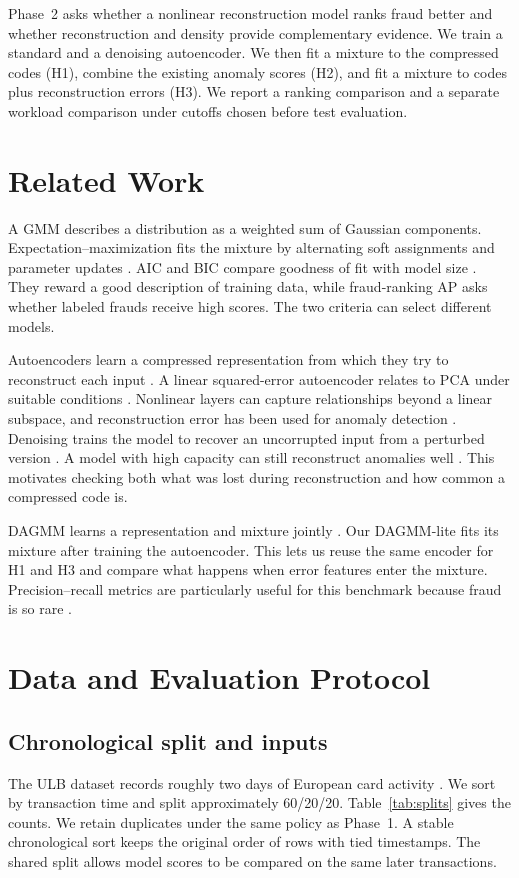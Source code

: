 Phase~2 asks whether a nonlinear reconstruction model ranks fraud better and whether reconstruction and density provide complementary evidence. We train a standard and a denoising autoencoder. We then fit a mixture to the compressed codes (H1), combine the existing anomaly scores (H2), and fit a mixture to codes plus reconstruction errors (H3). We report a ranking comparison and a separate workload comparison under cutoffs chosen before test evaluation.

\section{Related Work}
A GMM describes a distribution as a weighted sum of Gaussian components. Expectation--maximization fits the mixture by alternating soft assignments and parameter updates \cite{dempster1977maximum,mclachlan2000finite}. AIC and BIC compare goodness of fit with model size \cite{akaike1974new,schwarz1978estimating}. They reward a good description of training data, while fraud-ranking AP asks whether labeled frauds receive high scores. The two criteria can select different models.

Autoencoders learn a compressed representation from which they try to reconstruct each input \cite{hinton2006reducing}. A linear squared-error autoencoder relates to PCA under suitable conditions \cite{baldi1989neural}. Nonlinear layers can capture relationships beyond a linear subspace, and reconstruction error has been used for anomaly detection \cite{sakurada2014anomaly}. Denoising trains the model to recover an uncorrupted input from a perturbed version \cite{vincent2008extracting,vincent2011connection}. A model with high capacity can still reconstruct anomalies well \cite{gong2019memorizing}. This motivates checking both what was lost during reconstruction and how common a compressed code is.

DAGMM learns a representation and mixture jointly \cite{zong2018deep}. Our DAGMM-lite fits its mixture after training the autoencoder. This lets us reuse the same encoder for H1 and H3 and compare what happens when error features enter the mixture. Precision--recall metrics are particularly useful for this benchmark because fraud is so rare \cite{davis2006relationship,saito2015precision}.

\section{Data and Evaluation Protocol}
\subsection{Chronological split and inputs}
The ULB dataset records roughly two days of European card activity \cite{dalpozzolo2015calibrating}. We sort by transaction time and split approximately 60/20/20. Table~\ref{tab:splits} gives the counts. We retain duplicates under the same policy as Phase~1. A stable chronological sort keeps the original order of rows with tied timestamps. The shared split allows model scores to be compared on the same later transactions.

